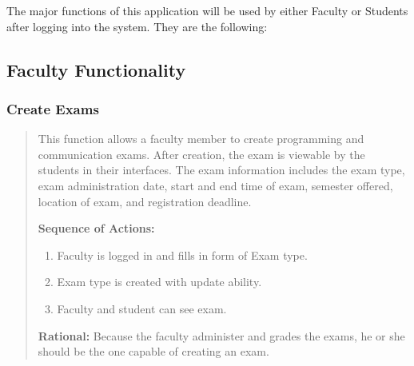 
The major functions of this application will be used by either Faculty or Students
after logging into the system. They are the following:

\subsection*{Faculty Functionality}

\subsubsection{Create Exams} 
   \begin{quote} %
         This function allows a faculty member to create
         programming and communication exams. After creation, the exam is
         viewable by the students in their interfaces. The exam information
         includes the exam type, exam administration
         date, start and end time of exam, semester offered, location of
         exam, and registration deadline.

         \textbf{Sequence of Actions:}
         \begin{enumerate}
            \item Faculty is logged in and fills in form of Exam type.
            \item Exam type is created with update ability.
            \item Faculty and student can see exam.
         \end{enumerate}

         \textbf{Rational:}
         Because the faculty administer and grades the exams, he or she should
         be the one capable of creating an exam.
   \end{quote} %

